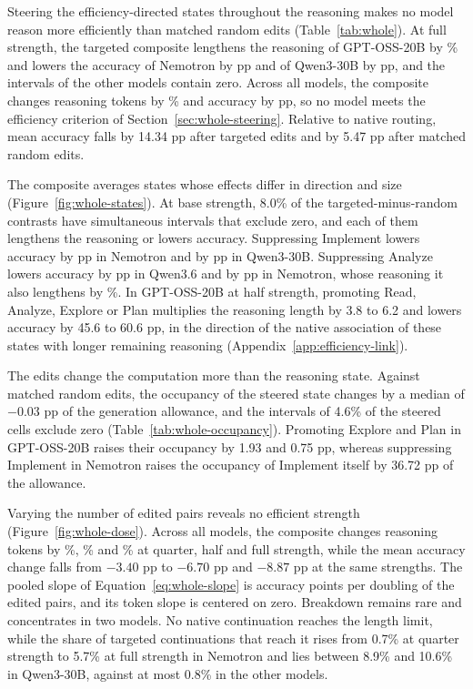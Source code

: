 Steering the efficiency-directed states throughout the reasoning makes no model reason more efficiently than matched random edits (Table~\ref{tab:whole}).
%
At full strength, the targeted composite lengthens the reasoning of GPT-OSS-20B by \% and lowers the accuracy of Nemotron by  pp and of Qwen3-30B by  pp, and the intervals of the other models contain zero.
%
Across all models, the composite changes reasoning tokens by \% and accuracy by  pp, so no model meets the efficiency criterion of Section~\ref{sec:whole-steering}.
%
Relative to native routing, mean accuracy falls by 14.34 pp after targeted edits and by 5.47 pp after matched random edits.
%

The composite averages states whose effects differ in direction and size (Figure~\ref{fig:whole-states}).
%
At base strength, 8.0\% of the targeted-minus-random contrasts have simultaneous intervals that exclude zero, and each of them lengthens the reasoning or lowers accuracy.
%
Suppressing Implement lowers accuracy by  pp in Nemotron and by  pp in Qwen3-30B.
%
Suppressing Analyze lowers accuracy by  pp in Qwen3.6 and by  pp in Nemotron, whose reasoning it also lengthens by \%.
%
In GPT-OSS-20B at half strength, promoting Read, Analyze, Explore or Plan multiplies the reasoning length by 3.8 to 6.2 and lowers accuracy by 45.6 to 60.6 pp, in the direction of the native association of these states with longer remaining reasoning (Appendix~\ref{app:efficiency-link}).
%

The edits change the computation more than the reasoning state.
%
Against matched random edits, the occupancy of the steered state changes by a median of $-0.03$ pp of the generation allowance, and the intervals of 4.6\% of the steered cells exclude zero (Table~\ref{tab:whole-occupancy}).
%
Promoting Explore and Plan in GPT-OSS-20B raises their occupancy by 1.93 and 0.75 pp, whereas suppressing Implement in Nemotron raises the occupancy of Implement itself by 36.72 pp of the allowance.
%

Varying the number of edited pairs reveals no efficient strength (Figure~\ref{fig:whole-dose}).
%
Across all models, the composite changes reasoning tokens by \%, \% and \% at quarter, half and full strength, while the mean accuracy change falls from $-3.40$ pp to $-6.70$ pp and $-8.87$ pp at the same strengths.
%
The pooled slope of Equation~\eqref{eq:whole-slope} is  accuracy points per doubling of the edited pairs, and its token slope is centered on zero.
%
Breakdown remains rare and concentrates in two models.
%
No native continuation reaches the length limit, while the share of targeted continuations that reach it rises from 0.7\% at quarter strength to 5.7\% at full strength in Nemotron and lies between 8.9\% and 10.6\% in Qwen3-30B, against at most 0.8\% in the other models.
%

